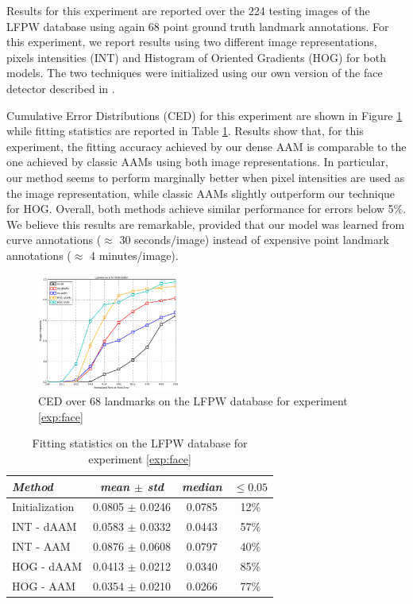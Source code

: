 Results for this experiment are reported over the 224 testing images of the LFPW database using again 68 point ground truth landmark annotations. For this experiment, we report results using two different image representations, \ie pixels intensities (INT) and Histogram of Oriented Gradients (HOG) \cite{Dalal2005} for both models. The two techniques were initialized using our own version of the face detector described in \cite{Zhu2012}.

Cumulative Error Distributions (CED) for this experiment are shown in Figure \ref{fig:face_ced} while fitting statistics are reported in Table \ref{tab:face_stats}. Results show that, for this experiment, the fitting accuracy achieved by our dense AAM is comparable to the one achieved by classic AAMs using both image representations. In particular, our method seems to perform marginally better when pixel intensities are used as the image representation, while classic AAMs slightly outperform our technique for HOG. Overall, both methods achieve similar performance for errors below 5\%. We believe this results are remarkable, provided that our model was learned from curve annotations ($\approx$ 30 seconds/image) instead of expensive point landmark annotations ($\approx$ 4 minutes/image).

\begin{figure}[t!]
\centering
\includegraphics[width=0.42\textwidth]{resources/Fig_Alignment/face_ced}
\caption{CED over 68 landmarks on the LFPW database for experiment \ref{exp:face}}
\label{fig:face_ced}
\end{figure}

\begin{table}[t]
\small
\centering
\begin{tabular}{|l|c|c|c|}
\hline
\emph{Method}   & \emph{mean $\pm$ std} & \emph{median} & $\leq 0.05$\\
\hline\hline
Initialization  & 0.0805 $\pm$ 0.0246 & 0.0785 & 12\%\\
INT - dAAM      & 0.0583 $\pm$ 0.0332 & 0.0443 & 57\%\\
INT - AAM       & 0.0876 $\pm$ 0.0608 & 0.0797 & 40\%\\
HOG - dAAM      & 0.0413 $\pm$ 0.0212 & 0.0340 & 85\%\\
HOG - AAM       & 0.0354 $\pm$ 0.0210 & 0.0266 & 77\%\\
\hline
\end{tabular}
\caption{Fitting statistics on the LFPW database for experiment \ref{exp:face}}
\label{tab:face_stats}
\end{table}

